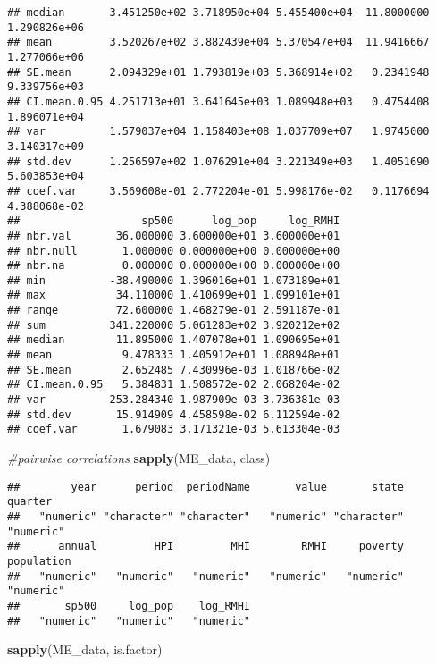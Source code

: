 \documentclass[
]{article}
\newenvironment{Shaded}{\begin{snugshade}}{\end{snugshade}}
\newcommand{\CommentTok}[1]{\textcolor[rgb]{0.56,0.35,0.01}{\textit{#1}}}
\newcommand{\KeywordTok}[1]{\textcolor[rgb]{0.13,0.29,0.53}{\textbf{#1}}}
\newcommand{\NormalTok}[1]{#1}
\begin{document}
\begin{verbatim}
## median       3.451250e+02 3.718950e+04 5.455400e+04  11.8000000 1.290826e+06
## mean         3.520267e+02 3.882439e+04 5.370547e+04  11.9416667 1.277066e+06
## SE.mean      2.094329e+01 1.793819e+03 5.368914e+02   0.2341948 9.339756e+03
## CI.mean.0.95 4.251713e+01 3.641645e+03 1.089948e+03   0.4754408 1.896071e+04
## var          1.579037e+04 1.158403e+08 1.037709e+07   1.9745000 3.140317e+09
## std.dev      1.256597e+02 1.076291e+04 3.221349e+03   1.4051690 5.603853e+04
## coef.var     3.569608e-01 2.772204e-01 5.998176e-02   0.1176694 4.388068e-02
##                   sp500      log_pop     log_RMHI
## nbr.val       36.000000 3.600000e+01 3.600000e+01
## nbr.null       1.000000 0.000000e+00 0.000000e+00
## nbr.na         0.000000 0.000000e+00 0.000000e+00
## min          -38.490000 1.396016e+01 1.073189e+01
## max           34.110000 1.410699e+01 1.099101e+01
## range         72.600000 1.468279e-01 2.591187e-01
## sum          341.220000 5.061283e+02 3.920212e+02
## median        11.895000 1.407078e+01 1.090695e+01
## mean           9.478333 1.405912e+01 1.088948e+01
## SE.mean        2.652485 7.430996e-03 1.018766e-02
## CI.mean.0.95   5.384831 1.508572e-02 2.068204e-02
## var          253.284340 1.987909e-03 3.736381e-03
## std.dev       15.914909 4.458598e-02 6.112594e-02
## coef.var       1.679083 3.171321e-03 5.613304e-03
\end{verbatim}

\begin{Shaded}
\begin{Highlighting}[]
\CommentTok{#pairwise correlations}
\KeywordTok{sapply}\NormalTok{(ME_data, class)}
\end{Highlighting}
\end{Shaded}

\begin{verbatim}
##        year      period  periodName       value       state     quarter 
##   "numeric" "character" "character"   "numeric" "character"   "numeric" 
##      annual         HPI         MHI        RMHI     poverty  population 
##   "numeric"   "numeric"   "numeric"   "numeric"   "numeric"   "numeric" 
##       sp500     log_pop    log_RMHI 
##   "numeric"   "numeric"   "numeric"
\end{verbatim}

\begin{Shaded}
\begin{Highlighting}[]
\KeywordTok{sapply}\NormalTok{(ME_data, is.factor)}
\end{Highlighting}
\end{Shaded}
\end{document}

